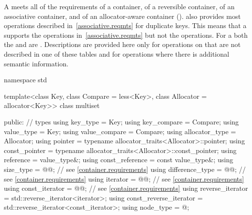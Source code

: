 \pnum
A  meets all of the requirements of a container, of a
reversible container, of an associative
container, and of an allocator-aware container
().
also provides most operations described in~\ref{associative.reqmts}
for duplicate keys.
This means that a
supports the
operations in~\ref{associative.reqmts}
but not the
operations.
For a
both the
and
are
.
Descriptions are provided here only for operations on
that are not described in one of these tables
and for operations where there is additional semantic information.

\begin{codeblock}
namespace std {
  template<class Key, class Compare = less<Key>,
           class Allocator = allocator<Key>>
  class multiset {
  public:
    // types
    using key_type               = Key;
    using key_compare            = Compare;
    using value_type             = Key;
    using value_compare          = Compare;
    using allocator_type         = Allocator;
    using pointer                = typename allocator_traits<Allocator>::pointer;
    using const_pointer          = typename allocator_traits<Allocator>::const_pointer;
    using reference              = value_type&;
    using const_reference        = const value_type&;
    using size_type              = @@; // see \ref{container.requirements}
    using difference_type        = @@; // see \ref{container.requirements}
    using iterator               = @@; // see \ref{container.requirements}
    using const_iterator         = @@; // see \ref{container.requirements}
    using reverse_iterator       = std::reverse_iterator<iterator>;
    using const_reverse_iterator = std::reverse_iterator<const_iterator>;
    using node_type              = @\unspec@;

}}
\end{codeblock}
